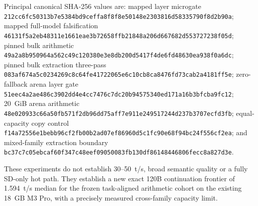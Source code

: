 Principal canonical SHA-256 values are: mapped layer microgate
\texttt{212cc6fc50313b7e5384bd9ceffa8f8f8e50148e2303816d58335790f8d2b90a};
mapped full-model falsification
\texttt{46131f5a2eb48311e1661eae3b72658ffb21848a206d667682d553727238f05d};
pinned bulk arithmetic
\texttt{49a2a8b950964a562c49c120380e3e8db200d5417f4de6fd48630ea938f0a6dc};
pinned bulk extraction three-pass
\texttt{083af674a5c0234269c8c64fe41722065e6c10cb8ca8476fd73cab2a4181ff5e};
zero-fallback arena layer gate
\texttt{51eec4a2ae486c3902dd4e4cc7476c7dc20b94575340ed171a16b3bfcba9fc12};
20~GiB arena arithmetic
\texttt{48e020933c66a50fb571f2db96dd75aff7e911e249517244d237b3707ecfd3fb};
equal-capacity copy control
\texttt{f14a72556e1bebb96cf2fb00b2ad07ef86960d5c1fc90e68f94bc24f556cf2ea};
and mixed-family extraction boundary
\texttt{bc37c7c05ebcaf60f347c48eef09050083fb130df86148446806fecc8a827d3e}.

These experiments do not establish 30--50~t/s, broad semantic quality or a
fully SD-only hot path. They establish a new exact 120B continuation frontier
of 1.594~t/s median for the frozen task-aligned arithmetic cohort on the
existing 18~GB M3 Pro, with a precisely measured cross-family capacity limit.
